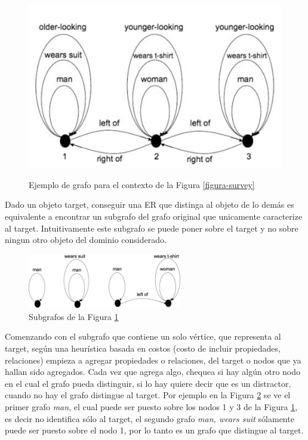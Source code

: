 \begin{figure}[!ht]
\begin{minipage}[t]{0.6\linewidth}
\includegraphics[width=\textwidth]{images/grafo-survey.png}\\[0pt]
\caption{Ejemplo de grafo para el contexto de la Figura \ref{figura-survey}}
\label{grafo-survey}
\end{minipage}
\end{figure}



Dado un objeto target, conseguir una ER que distinga al objeto de lo dem\'as es equivalente a encontrar un subgrafo del grafo original que unicamente caracterize al target. Intuitivamente este subgrafo se puede poner sobre el target y no sobre ningun otro objeto del dominio considerado.\\

\begin{figure}[ht]
\centering
\includegraphics[width=0.6\textwidth]{images/ref-exp-graph.png}
\caption{Subgrafos de la Figura \ref{grafo-survey}}
\label{ref-exp-graph}
\end{figure}

Comenzando con el subgrafo que contiene un solo v\'ertice, que representa al target, seg\'un una heur\'{i}stica basada en costos (costo de incluir propiedades, relaciones) empieza a agregar propiedades o relaciones, del target o nodos que ya hallan sido agregados. Cada vez que agrega algo, chequea si hay alg\'un otro nodo en el cual el grafo pueda distinguir, si lo hay quiere decir que es un distractor, cuando no hay el grafo distingue al target. Por ejemplo en la Figura \ref{ref-exp-graph} se ve el primer grafo {\it man}, el cual puede ser puesto sobre los nodos 1 y 3 de la Figura \ref{grafo-survey}, es decir no identifica s\'olo al target, el segundo grafo {\it man, wears suit} s\'olamente puede ser puesto sobre el nodo 1, por lo tanto es un grafo que distingue al target.  


